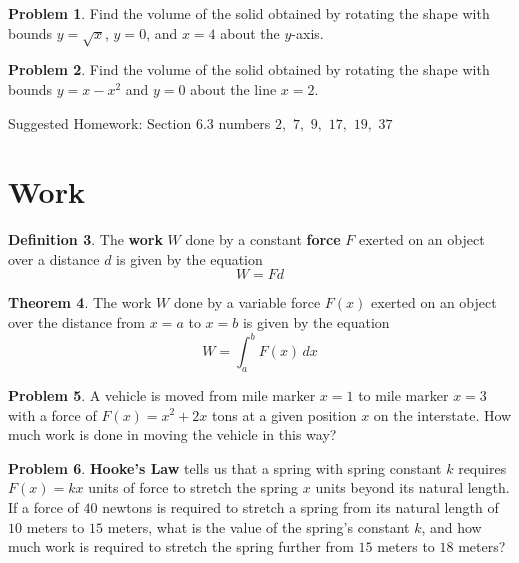 \documentclass[letterpaper, twoside, 12pt]{book}
\theoremstyle{definition}
\newtheorem{theorem}{Theorem}
\theoremstyle{definition}
\newtheorem{definition}[theorem]{Definition}
\newtheorem{problem}[theorem]{Problem}
\begin{document}
\vfill

\newpage

\begin{problem}
 Find the volume of the solid obtained by rotating the shape with bounds
 $y = \sqrt{x}$, $y=0$, and $x=4$ about the $y$-axis.
\end{problem}

\vfill

\begin{problem}
 Find the volume of the solid obtained by rotating the shape with bounds
 $y = x-x^2$ and $y = 0$ about the line $x=2$.
\end{problem}

\vfill

Suggested Homework: Section $6.3$ numbers $2,$ $7,$ $9,$ $17,$ $19,$ $37$


\newpage

\section{Work}

\begin{definition}
  The \textbf{work} $W$ done by a constant \textbf{force} $F$ exerted on
  an object over a distance $d$ is given by the equation \[W=Fd\]
\end{definition}

\begin{theorem}
  The work $W$ done by a variable force $F(x)$ exerted on an object over the
  distance from $x=a$ to $x=b$ is given by the equation \[W=\int_a^b F(x)\,dx\]
\end{theorem}

\begin{problem}
  A vehicle is moved from mile marker $x=1$ to mile marker $x=3$
  with a force of $F(x)=x^2+2x$ tons at a given position $x$ on the
  interstate. How much work is done in moving the vehicle in this way?
\end{problem}

\vfill

\begin{problem}
  \textbf{Hooke's Law} tells us that a spring with spring constant $k$ requires
  $F(x)=kx$ units of force to stretch the spring $x$ units beyond its natural
  length. If a force of $40$ newtons is required to stretch a spring from
  its natural length of $10$ meters to $15$ meters, what is the value of the
  spring's constant $k$, and how much
  work is required to stretch the spring further from $15$ meters to
  $18$ meters?
\end{problem}
\end{document}
